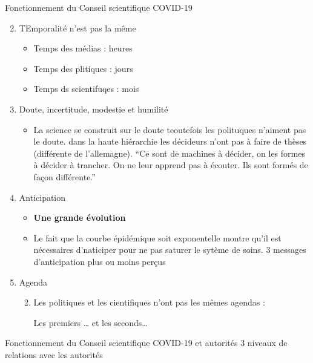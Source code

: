 \documentclass[
  ignorenonframetext,
]{beamer}
\providecommand{\tightlist}{%
  \setlength{\itemsep}{0pt}\setlength{\parskip}{0pt}}\usepackage{longtable,booktabs,array}
\begin{document}
\begin{frame}{Fonctionnement du Conseil scientifique COVID-19}
\protect\hypertarget{fonctionnement-du-conseil-scientifique-covid-19}{}
\begin{enumerate}
\setcounter{enumi}{1}
\tightlist
\item
  TEmporalité n'est pas la même

  \begin{itemize}
  \tightlist
  \item
    Temps des médias : heures
  \item
    Temps des plitiques : jours
  \item
    Temps ds scientifuqes : mois
  \end{itemize}
\item
  Doute, incertitude, modestie et humilité

  \begin{itemize}
  \tightlist
  \item
    La science se construit sur le doute teoutefois les polituques
    n'aiment pas le doute. dans la haute hiérarchie les décideurs n'ont
    pas à faire de thèses (différente de l'allemagne). ``Ce sont de
    machines à décider, on les formes à décider à trancher. On ne leur
    apprend pas à écouter. Ils sont formés de façon différente.''
  \end{itemize}
\item
  Anticipation

  \begin{itemize}
  \tightlist
  \item
    \textbf{Une grande évolution}
  \item
    Le fait que la courbe épidémique soit exponentelle montre qu'il est
    nécessaires d'naticiper pour ne pas saturer le sytème de soins. 3
    messages d'anticipation plus ou moins perçus
  \end{itemize}
\item
  Agenda

  \begin{enumerate}
  \setcounter{enumii}{1}
  \item
    Les politiques et les cientifiques n'ont pas les mêmes agendas :

    Les premiers \ldots{} et les seconds\ldots{}
  \end{enumerate}
\end{enumerate}
\end{frame}

\begin{frame}{Fonctionnement du Conseil scientifique COVID-19 et
autorités}
\protect\hypertarget{fonctionnement-du-conseil-scientifique-covid-19-et-autorituxe9s}{}
3 niveaux de relations avec les autorités
\end{frame}
\end{document}
